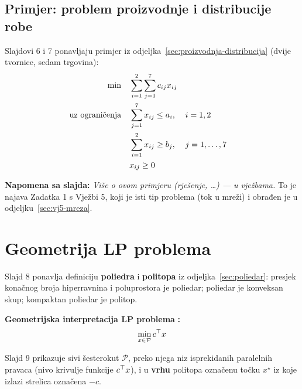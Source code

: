 \subsection{Primjer: problem proizvodnje i distribucije robe}

Slajdovi 6 i 7 ponavljaju primjer iz odjeljka~\ref{sec:proizvodnja-distribucija} (dvije tvornice, sedam
trgovina):
\begin{equation}
\begin{aligned}
\min \quad & \sum_{i=1}^{2}\sum_{j=1}^{7} c_{ij}x_{ij} \\
\uzogr & \sum_{j=1}^{7}x_{ij} \le a_i, && i = 1,2 \\
       & \sum_{i=1}^{2}x_{ij} \ge b_j, && j = 1,\dots,7 \\
       & x_{ij} \ge 0
\end{aligned}
\end{equation}

\textbf{Napomena sa slajda:} \emph{Više o ovom primjeru (rješenje, \dots) --- u
vježbama.} To je najava Zadatka 1 s Vježbi 5, koji je isti tip problema (tok u
mreži) i obrađen je u odjeljku~\ref{sec:vj5-mreza}.

\section{Geometrija LP problema}

Slajd 8 ponavlja definiciju \textbf{poliedra} i \textbf{politopa} iz
odjeljka~\ref{sec:poliedar}: presjek konačnog broja hiperravnina i poluprostora
je poliedar; poliedar je konveksan skup; kompaktan poliedar je politop.

\textbf{Geometrijska interpretacija LP problema} \textbf{:}
\[
\min_{x\in\mathcal{P}} c\T x
\]

Slajd 9 prikazuje sivi šesterokut $\mathcal{P}$, preko njega niz isprekidanih
paralelnih pravaca (nivo krivulje funkcije $c\T x$), i u \textbf{vrhu} politopa
označenu točku $x^\star$ iz koje izlazi strelica označena $-c$.

